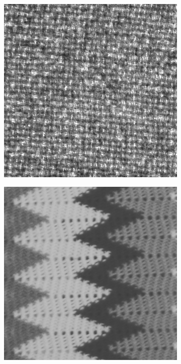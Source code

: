 \begin{figure}[H]
\begin{subfigure}{.15\textwidth}
  \centering
  \includegraphics[width=.8\linewidth]{kylberg_examples/blanket1_002.png}
\end{subfigure}%
\begin{subfigure}{.15\textwidth}
  \centering
  \includegraphics[width=.8\linewidth]{kylberg_examples/blanket2_002.png}
\end{subfigure}
\begin{subfigure}{.15\textwidth}
  \centering

\end{subfigure}
\end{figure}
